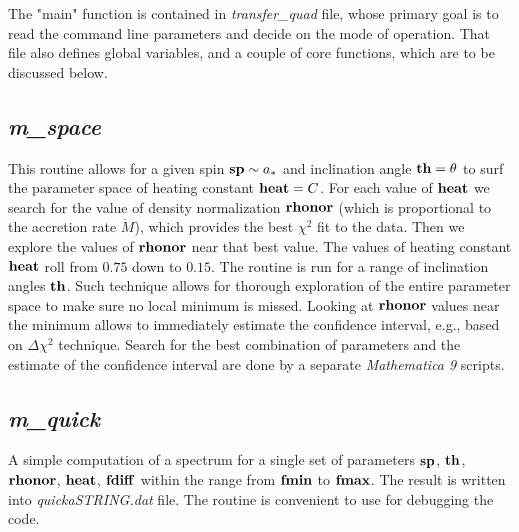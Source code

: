 \documentclass{emulateapj}
\newcommand{\mat}{\textit{Mathematica 9 }}
\begin{document}
The "main" function is contained in \textit{transfer\_quad} file, whose primary goal is to read the
command line parameters and decide on the mode of operation. That file also defines global variables,
and a couple of core functions, which are to be discussed below.

\subsection{\textit{m\_space}}
This routine allows for a given spin ${\bf sp}\sim a_*$ and inclination angle ${\bf th}=\theta$ to surf the parameter space of heating constant ${\bf heat}=C$.
For each value of ${\bf heat}$ we search for the value of density normalization ${\bf rhonor}$ (which is proportional to the accretion rate $\dot{M}$), 
which provides the best $\chi^2$ fit to the data. Then we explore the values of ${\bf rhonor}$ near that best value.
The values of heating constant ${\bf heat}$ roll from $0.75$ down to $0.15$.
The routine is run for a range of inclination angles ${\bf th}$.
Such technique allows for thorough exploration of the entire parameter space to make sure no local minimum is missed.
Looking at ${\bf rhonor}$ values near the minimum allows to immediately estimate the confidence interval, e.g., based on $\Delta\chi^2$ technique.
Search for the best combination of parameters and the estimate of the confidence interval are done by a separate \mat  scripts.

\subsection{\textit{m\_quick}}
A simple computation of a spectrum for a single set of parameters ${\bf sp}$, ${\bf th}$, ${\bf rhonor}$, ${\bf heat}$, ${\bf fdiff}$ within the range from
${\bf fmin}$ to ${\bf fmax}$. The result is written into \textit{quickaSTRING.dat} file.
The routine is convenient to use for debugging the code.
\end{document}
